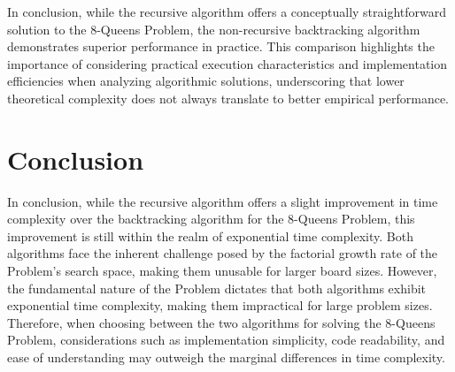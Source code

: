 \documentclass{article}
\begin{document}
In conclusion, while the recursive algorithm offers a conceptually
straightforward solution to the 8-Queens Problem, the non-recursive
backtracking algorithm demonstrates superior performance in practice.
This comparison highlights the importance of considering practical
execution characteristics and implementation efficiencies when analyzing
algorithmic solutions, underscoring that lower theoretical complexity
does not always translate to better empirical performance.

\section*{Conclusion}
In conclusion, while the recursive algorithm offers a slight improvement
in time complexity over the backtracking algorithm for the 8-Queens
Problem, this improvement is still within the realm of exponential time
complexity. Both algorithms face the inherent challenge posed by the
factorial growth rate of the Problem's search space,
making them unusable for larger board sizes. However, the fundamental
nature of the Problem dictates that both algorithms exhibit exponential
time complexity, making them impractical for large problem sizes.
Therefore, when choosing between the two algorithms for solving the
8-Queens Problem, considerations such as implementation simplicity, code
readability, and ease of understanding may outweigh the marginal
differences in time complexity.
\end{document}
